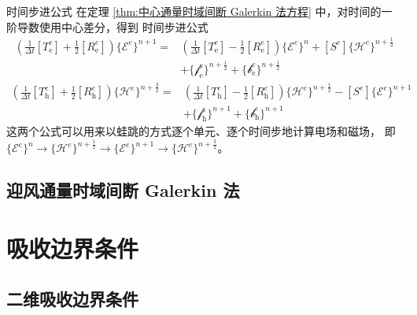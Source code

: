 \begin{theorem}{时间步进公式}
    在定理 \ref{thm:中心通量时域间断 Galerkin 法方程} 中，对时间的一阶导数使用中心差分，得到
    时间步进公式
    \begin{equation}
        \begin{aligned}
            \left(
                \frac{1}{\Delta t}[T^e_{\text{e}}]
                +\frac{1}{2}[R^e_{\text{e}}]
            \right)\{\mathscr{E}^e\}^{n+1}
            =&\left(
                \frac{1}{\Delta t}[T^e_{\text{e}}]
                -\frac{1}{2}[R^e_{\text{e}}]
            \right)\{\mathscr{E}^e\}^{n}
            +[S^e]\{\mathscr{H}^e\}^{n+\frac{1}{2}}\\
            &+\{\mathscr{f}^e_{\text{e}}\}^{n+\frac{1}{2}}
            +\{\mathscr{b}^e_{\text{e}}\}^{n+\frac{1}{2}}
        \end{aligned}
    \end{equation}
    \begin{equation}
        \begin{aligned}
            \left(
                \frac{1}{\Delta t}[T^e_{\text{h}}]
                +\frac{1}{2}[R^e_{\text{h}}]
            \right)\{\mathscr{H}^e\}^{n+\frac{3}{2}}
            =&\left(
                \frac{1}{\Delta t}[T^e_{\text{h}}]
                -\frac{1}{2}[R^e_{\text{h}}]
            \right)\{\mathscr{H}^e\}^{n+\frac{1}{2}}
            -[S^e]\{\mathscr{E}^e\}^{n+1}\\
            &+\{\mathscr{f}^e_{\text{h}}\}^{n+1}
            +\{\mathscr{b}^e_{\text{h}}\}^{n+1}
        \end{aligned}
    \end{equation}
    这两个公式可以用来以蛙跳的方式逐个单元、逐个时间步地计算电场和磁场，
    即 $\{\mathscr{E}^e\}^{n}
    \rightarrow \{\mathscr{H}^e\}^{n+\frac{1}{2}}
    \rightarrow \{\mathscr{E}^e\}^{n+1}
    \rightarrow \{\mathscr{H}^e\}^{n+\frac{3}{2}}$。
\end{theorem}

\subsection{迎风通量时域间断 Galerkin 法}

\section{吸收边界条件}

\subsection{二维吸收边界条件}

